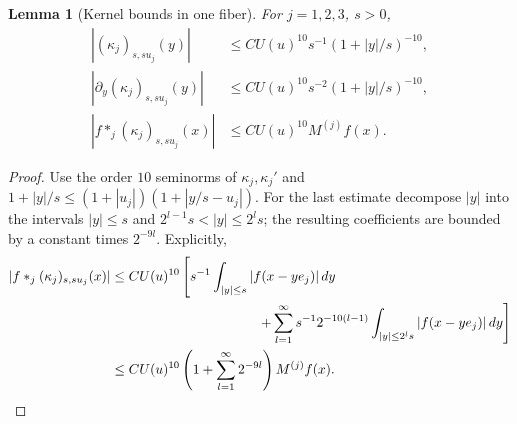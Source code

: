 \documentclass[12pt,reqno]{amsart}
\theoremstyle{plain}
\newtheorem{lemma}[theorem]{Lemma}
\theoremstyle{definition}
\theoremstyle{remark}
\numberwithin{equation}{section}
\newcommand{\dd}{\,d}
\begin{document}
\begin{lemma}[Kernel bounds in one fiber]\label{lem:fiber_kernel}
For $j=1,2,3$, $s>0$,
\begin{align*}
 |(\kappa_j)_{s,su_j}(y)|&\le C U(u)^{10}s^{-1}(1+|y|/s)^{-10},\\
 |\partial_y(\kappa_j)_{s,su_j}(y)|&\le C U(u)^{10}s^{-2}(1+|y|/s)^{-10},\\
 |f*_j(\kappa_j)_{s,su_j}(x)|&\le C U(u)^{10}M^{(j)}f(x).
\end{align*}
\end{lemma}
\begin{proof}
Use the order $10$ seminorms of $\kappa_j,\kappa_j'$ and
$1+|y|/s\le(1+|u_j|)(1+|y/s-u_j|)$.
For the last estimate decompose $|y|$ into the intervals
$|y|\le s$ and $2^{l-1}s<|y|\le2^ls$; the resulting coefficients
are bounded by a constant times $2^{-9l}$. Explicitly,
\begin{align*}
 |f*_j(\kappa_j)_{s,su_j}(x)|
 &\le C U(u)^{10}\left[
 s^{-1}\int_{|y|\le s}|f(x-ye_j)|\dd y\right.\\
 &\hspace{38mm}\left.
 +\sum_{l=1}^{\infty}s^{-1}2^{-10(l-1)}
                    \int_{|y|\le2^ls}|f(x-ye_j)|\dd y\right]\\
 &\le C U(u)^{10}\left(1+\sum_{l=1}^\infty2^{-9l}\right)
                                                M^{(j)}f(x).
\end{align*}
\end{proof}
\end{document}
